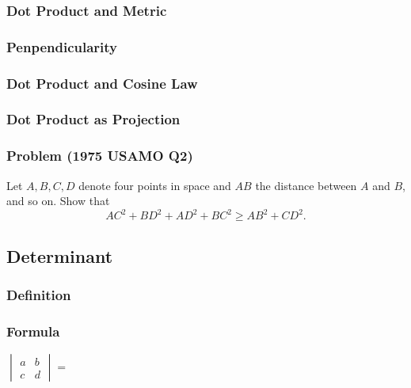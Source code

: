 \documentclass{article}
\begin{document}
\subsubsection{Dot Product and Metric}
\vspace{30px}
\subsubsection{Penpendicularity}
\vspace{30px}
\subsubsection{Dot Product and Cosine Law}
\vspace{100px}
\subsubsection{Dot Product as Projection}
\pagebreak
\subsubsection{Problem (1975 USAMO Q2)}
Let $A,B,C,D$ denote four points in space and $AB$ the distance between $A$ and $B$, and so on. Show that\[AC^2+BD^2+AD^2+BC^2\ge AB^2+CD^2.\]

\pagebreak

\subsection{Determinant}
\subsubsection{Definition}
\vspace*{20px}
\subsubsection{Formula}

$
\begin{vmatrix}
    a & b\\
    c & d
\end{vmatrix}
=
$
\end{document}
